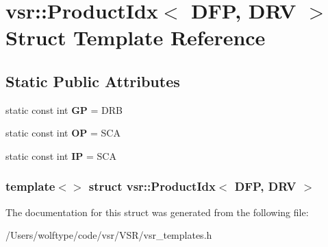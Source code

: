 \hypertarget{structvsr_1_1_product_idx_3_01_d_f_p_00_01_d_r_v_01_4}{\section{vsr\-:\-:Product\-Idx$<$ D\-F\-P, D\-R\-V $>$ Struct Template Reference}
\label{structvsr_1_1_product_idx_3_01_d_f_p_00_01_d_r_v_01_4}
}
\subsection*{Static Public Attributes}
\begin{DoxyCompactItemize}
\item 
\hypertarget{structvsr_1_1_product_idx_3_01_d_f_p_00_01_d_r_v_01_4_acc22302849ddcf91f815d848e9d82ed5}{static const int {\bfseries G\-P} = D\-R\-B}\label{structvsr_1_1_product_idx_3_01_d_f_p_00_01_d_r_v_01_4_acc22302849ddcf91f815d848e9d82ed5}

\item 
\hypertarget{structvsr_1_1_product_idx_3_01_d_f_p_00_01_d_r_v_01_4_a88b74ae9ebe050003cca2f6a367ddd90}{static const int {\bfseries O\-P} = S\-C\-A}\label{structvsr_1_1_product_idx_3_01_d_f_p_00_01_d_r_v_01_4_a88b74ae9ebe050003cca2f6a367ddd90}

\item 
\hypertarget{structvsr_1_1_product_idx_3_01_d_f_p_00_01_d_r_v_01_4_a4c7bec75be7adc0a3e69b637d22f792a}{static const int {\bfseries I\-P} = S\-C\-A}\label{structvsr_1_1_product_idx_3_01_d_f_p_00_01_d_r_v_01_4_a4c7bec75be7adc0a3e69b637d22f792a}

\end{DoxyCompactItemize}
\subsubsection*{template$<$$>$ struct vsr\-::\-Product\-Idx$<$ D\-F\-P, D\-R\-V $>$}



The documentation for this struct was generated from the following file\-:\begin{DoxyCompactItemize}
\item 
/\-Users/wolftype/code/vsr/\-V\-S\-R/vsr\-\_\-templates.\-h\end{DoxyCompactItemize}
